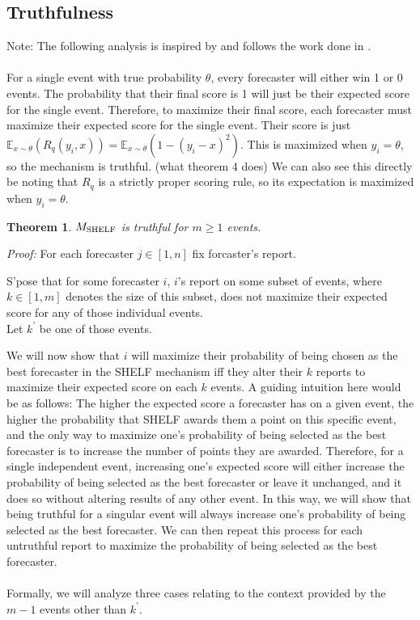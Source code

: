 \documentclass[letterpaper,12pt]{article}
\newcommand{\E}{\mathbb{E}}
\newcommand{\1}{\mathbbm{1}}
\newtheorem{theorem}{Theorem}
\begin{document}
\subsection{Truthfulness}
Note: The following analysis is inspired by and follows the work done in \cite{elf}.\\\\
For a single event with true probability $\theta$, every forecaster will either win 1 or 0 events. The probability that their final score is 1 will just be their expected score for the single event. Therefore, to maximize their final score, each forecaster must maximize their expected score for the single event. Their score is just $\E_{x \sim \theta}(R_q(y_i, x)) = \E_{x \sim \theta}(1 - (y_i - x)^2)$. This is maximized when $y_i = \theta$, so the mechanism is truthful. (what theorem 4 does) We can also see this directly be noting that $R_q$ is a strictly proper scoring rule, so its expectation is maximized when $y_i = \theta$. 

\begin{theorem}
  \label{shelf_truthful}
    $M_{\mathrm{SHELF}}$ is truthful for $m \geq 1$ events.
\end{theorem}
\emph{Proof:} For each forecaster $j \in [1, n]$ fix forcaster's report.

S'pose that for some forecaster $i$, $i$'s report on some subset of events, where $k \in [1, m]$ denotes the size of this subset, does not maximize their expected score for any of those individual events.\\
Let $k^\prime$ be one of those events.

We will now show that $i$ will maximize their probability of being chosen as the best forecaster in the SHELF mechanism iff they alter their $k$ reports to maximize their expected score on each $k$ events. A guiding intuition here would be as follows: The higher the expected score a forecaster has on a given event, the higher the probability that SHELF awards them a point on this specific event, and the only way to maximize one's probability of being selected as the best forecaster is to increase the number of points they are awarded. Therefore, for a single independent event, increasing one's expected score will either increase the probability of being selected as the best forecaster or leave it unchanged, and it does so without altering results of any other event. In this way, we will show that being truthful for a singular event will always increase one's probability of being selected as the best forecaster. We can then repeat this process for each untruthful report to maximize the probability of being selected as the best forecaster.\\\\
Formally, we will analyze three cases relating to the context provided by the $m - 1$ events other than $k^\prime$.
\end{document}
